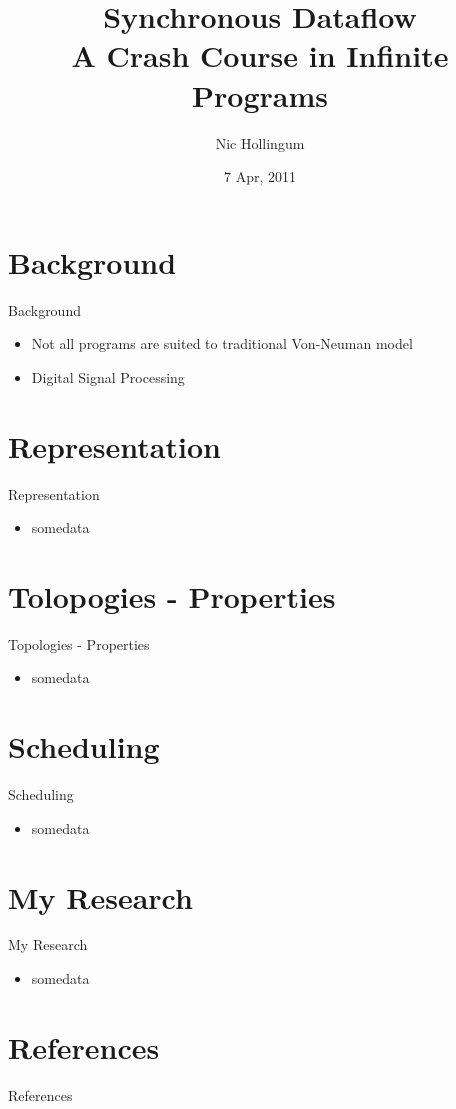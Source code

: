 \documentclass{beamer}
\title[SDF Crash Course]{Synchronous Dataflow\\A Crash Course in Infinite Programs}
\author{Nic Hollingum}
\institute{USYD}
\date{7 Apr, 2011}
\begin{document}
\begin{frame}
\titlepage
\end{frame}

\section{Background}

\begin{frame}{Background}
\begin{itemize}
	\item Not all programs are suited to traditional Von-Neuman model
	\item Digital Signal Processing
\end{itemize}
\end{frame}

\section{Representation}

\begin{frame}{Representation}
\begin{itemize}
	\item somedata\cite{lee87}
\end{itemize}
\end{frame}

\section{Tolopogies - Properties}

\begin{frame}{Topologies - Properties}
\begin{itemize}
	\item somedata\cite{sdfBook, lee87}
\end{itemize}
\end{frame}

\section{Scheduling}

\begin{frame}{Scheduling}
\begin{itemize}
	\item somedata\cite{mal08}
\end{itemize}
\end{frame}

\section{My Research}

\begin{frame}{My Research}
\begin{itemize}
	\item somedata\cite{sih91, thi10}
\end{itemize}
\end{frame}

\section{References}
\begin{frame}[allowframebreaks]{References}


\end{frame}
\end{document}
